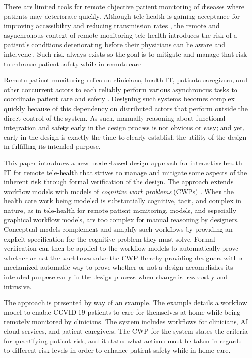 There are limited tools for remote objective patient monitoring of diseases where patients may deteriorate quickly. Although tele-health is gaining acceptance for improving accessibility and reducing transmission rates \cite{10.1093/jamia/ocaa048,telehealth,10.1093/jamia/ocaa067}, the remote and asynchronous context of remote monitoring tele-health introduces the risk of a patient's conditions deteriorating before their physicians can be aware and intervene \cite{10.1097/ALN.0000000000003578}. Such risk always exists so the goal is to mitigate and manage that risk to enhance patient safety while in remote care. 

Remote patient monitoring relies on clinicians, health IT, patients-caregivers, and other concurrent actors to each reliably perform various asynchronous tasks to coordinate patient care and safety \cite{remote,Aalam229}. Designing such systems becomes complex quickly because of this dependency on distributed actors that perform outside the direct control of the system. As such, manually reasoning about functional integration and safety early in the design process is not obvious or easy; and yet, early in the design is exactly the time to clearly establish the utility of the design in fulfilling its intended purpose. 

This paper introduces a new model-based design approach for interactive health IT for remote tele-health that strives to manage and mitigate some aspects of the inherent risk through formal verification of the design. The approach extends workflow models with models of \emph{cognitive work problems} (CWPs) \cite{workflowmodel,workcentered,BERRY201615,chi2010}. When the health care work being modeled is substantially cognitive, tacit, and complex in nature, as in tele-health for remote patient monitoring, models, and especially graphical workflow models, are too complex for manual reasoning by designers. Conceptual models complement and simplify such workflows by providing an explicit specification for the cognitive problem they must solve. Formal verification can then be applied to the workflow models to automatically prove whether or not the workflows solve the CWP thereby providing designers with a mechanized automatic way to prove whether or not a design accomplishes its intended purpose early in the design process when change is less costly and intrusive.

The approach is presented by way of an example. The example details a workflow model to enable COVID-19 patients to care for themselves at home while being remotely monitored by clinicians. The system includes workflows for clinicians, AI cloud services, and patient-caregivers. The CWP for the system states the criteria for quantifying patient risk, and it states what actions must be taken in regards to different risk levels in order to enhance patient safety while in home care. 

